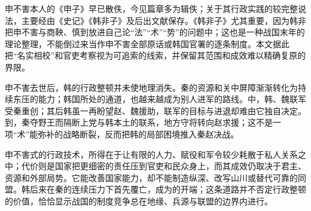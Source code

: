 \begin{sourcenote}
申不害本人的《申子》早已散佚，今见篇章多为辑佚；关于其行政实践的较完整说法，主要经由《史记》《韩非子》及后出文献保存。《韩非子》尤其重要，因为韩非把申不害与商鞅、慎到放进自己论“法”“术”“势”的问题中；这也是一种战国末年的理论整理，不能倒过来当作申不害全部原话或韩国官署的逐条制度。本文据此把“名实相校”和官吏考察视为可追索的线索，并保留其范围和成效难以精确复原的界限。
\end{sourcenote}

申不害去世后，韩的行政整顿并未使地理消失。秦的资源和关中屏障渐渐转化为持续东压的能力；韩国所处的通道，也越来越成为别人进军的路线。中，韩、魏联军受秦重创；其后韩虽一再盼望赵、魏援助，联军的目标与进退却难由它独自决定。到，秦夺野王而隔断上党与韩本土的联系，地方守将转向赵求援；这不是一项“术”能弥补的战略断裂，反而把韩的局部困境推入秦赵决战。

\begin{turningpoint}
申不害式的行政技术，所得在于让有限的人力、赋役和军令较少耗散于私人关系之中；代价则是国家把更细密的责任压到官吏和民众身上，而其成效仍取决于君主、资源和外部局势。它能改善国家能力，却不能制造纵深、改写山川或替代可靠的同盟。韩后来在秦的连续压力下首先覆亡，成为的开端；这条道路并不否定行政整顿的价值，恰恰显示战国的制度竞争总在地缘、兵源与联盟的边界内进行。
\end{turningpoint}
